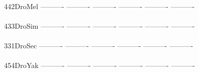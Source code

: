 \documentclass[11pt,twoside,reqno,a4paper]{article}
\begin{document}
{\\
442\hspace*{2\charwidth}DroMel	----------	----------	----------	----------	----------	----------	\\
\hspace*{5\charwidth}\hspace*{7\charwidth}\hspace*{1\charwidth}\hspace*{1\charwidth}\hspace*{1\charwidth}\hspace*{1\charwidth}\hspace*{1\charwidth}\hspace*{1\charwidth}\\
433\hspace*{2\charwidth}DroSim	----------	----------	----------	----------	----------	----------	\\
\hspace*{5\charwidth}\hspace*{7\charwidth}\hspace*{1\charwidth}\hspace*{1\charwidth}\hspace*{1\charwidth}\hspace*{1\charwidth}\hspace*{1\charwidth}\hspace*{1\charwidth}\\
331\hspace*{2\charwidth}DroSec	----------	----------	----------	----------	----------	----------	\\
\hspace*{5\charwidth}\hspace*{7\charwidth}\hspace*{1\charwidth}\hspace*{1\charwidth}\hspace*{1\charwidth}\hspace*{1\charwidth}\hspace*{1\charwidth}\hspace*{1\charwidth}\\
454\hspace*{2\charwidth}DroYak	----------	----------	----------	----------	----------	----------	\\
\hspace*{5\charwidth}\hspace*{7\charwidth}\hspace*{1\charwidth}\hspace*{1\charwidth}\hspace*{1\charwidth}\hspace*{1\charwidth}\hspace*{1\charwidth}\hspace*{1\charwidth}\\
}
\end{document}
